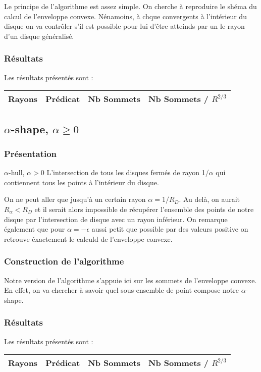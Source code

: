 Le principe de l’algorithme est assez simple. On cherche à reproduire le shéma du calcul de l’enveloppe convexe. Nénamoins, à chque convergents à l'intérieur du disque on va contrôler s'il est possible pour lui d'être atteinds par un le rayon d'un disque généralisé.


\subsubsection{Résultats}

Les résultats présentés sont : 

\begin{tabular}{|l|c||c|c|}
\hline
Rayons & Prédicat & Nb Sommets & Nb Sommets / $R^{2/3}$\\
\hline

\hline
\end{tabular} 



\subsection{$\alpha$-shape, $\alpha \geq 0$}

\subsubsection{Présentation}

\begin{Definition}{$\alpha$-hull, $\alpha > 0$}
\label{def:pas}
      L'intersection de tous les disques fermés de rayon 1/$\alpha$ qui contiennent tous les points à l’intérieur du disque.
\end{Definition}

On ne peut aller que jusqu'à un certain rayon $\alpha = 1/R_D$. Au delà, on aurait $R_{\alpha} < R_D$ et il serait alors impossible de récupérer l'ensemble des points de notre disque par l'intersection de disque avec un rayon inférieur. On remarque également que 
pour $\alpha = -\epsilon$ aussi petit que possible par des valeurs positive on retrouve éxactement le calculd de l'enveloppe convexe.
\subsubsection{Construction de l'algorithme}

Notre version de l'algorithme s'appuie ici sur les sommets de l'enveloppe convexe. En effet, on va chercher à savoir quel sous-ensemble de point compose notre $\alpha$-shape.

\subsubsection{Résultats}

Les résultats présentés sont : 

\begin{tabular}{|l|c||c|c|}
\hline
Rayons & Prédicat & Nb Sommets & Nb Sommets / $R^{2/3}$\\
\hline

\hline
\end{tabular} 



